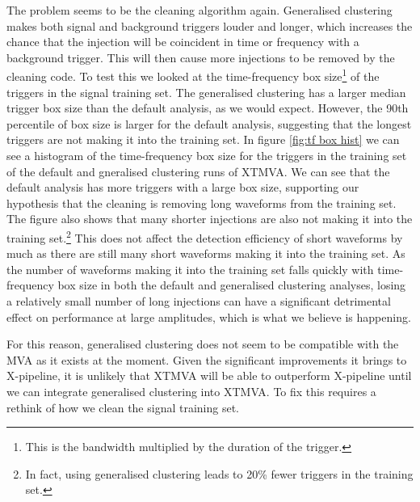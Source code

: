 \documentclass[11pt]{cuthesis}
\newcommand{\xp}{X-pipeline }
\begin{document}
The problem seems to be the cleaning algorithm again. Generalised clustering makes both signal and background triggers louder and longer, which increases the chance that the injection will be coincident in time or frequency with a background trigger. This will then cause more injections to be removed by the cleaning code. To test this we looked at the time-frequency box size\footnote{This is the bandwidth multiplied by the duration of the trigger.} of the triggers in the signal training set. The generalised clustering has a larger median trigger box size than the default analysis, as we would expect. However, the 90th percentile of box size is larger for the default analysis, suggesting that the longest triggers are not making it into the training set. In figure \ref{fig:tf box hist} we can see a histogram of the time-frequency box size for the triggers in the training set of the default and gneralised clustering runs of XTMVA. We can see that the default analysis has more triggers with a large box size, supporting our hypothesis that the cleaning is removing long waveforms from the training set. The figure also shows that many shorter injections are also not making it into the training set.\footnote{In fact, using generalised clustering leads to 20\% fewer triggers in the training set.} This does not affect the detection efficiency of short waveforms by much as there are still many short waveforms making it into the training set. As the number of waveforms making it into the training set falls quickly with time-frequency box size in both the default and generalised clustering analyses, losing a relatively small number of long injections can have a significant detrimental effect on performance at large amplitudes, which is what we believe is happening.

For this reason, generalised clustering does not seem to be compatible with the MVA as it exists at the moment. Given the significant improvements it brings to X-pipeline, it is unlikely that XTMVA will be able to outperform \xp until we can integrate generalised clustering into XTMVA. To fix this requires a rethink of how we clean the signal training set.
\end{document}
